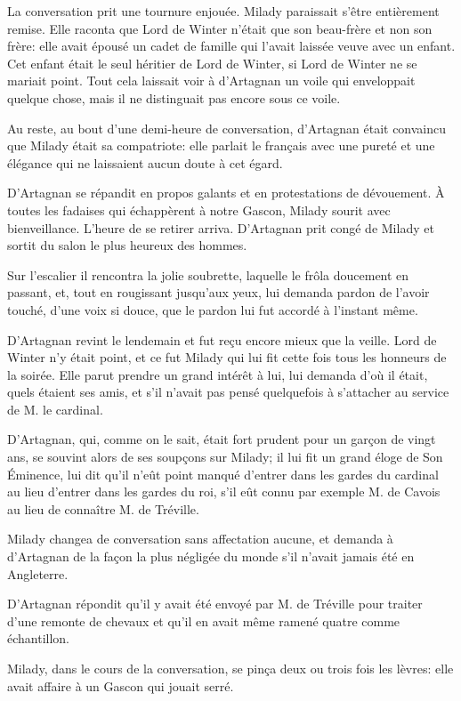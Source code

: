 La conversation prit une tournure enjouée. Milady paraissait s'être entièrement remise. Elle raconta que Lord de Winter n'était que son beau-frère et non son frère: elle avait épousé un cadet de famille qui l'avait laissée veuve avec un enfant. Cet enfant était le seul héritier de Lord de Winter, si Lord de Winter ne se mariait point. Tout cela laissait voir à d'Artagnan un voile qui enveloppait quelque chose, mais il ne distinguait pas encore sous ce voile. 

Au reste, au bout d'une demi-heure de conversation, d'Artagnan était convaincu que Milady était sa compatriote: elle parlait le français avec une pureté et une élégance qui ne laissaient aucun doute à cet égard. 

D'Artagnan se répandit en propos galants et en protestations de dévouement. À toutes les fadaises qui échappèrent à notre Gascon, Milady sourit avec bienveillance. L'heure de se retirer arriva. D'Artagnan prit congé de Milady et sortit du salon le plus heureux des hommes. 

Sur l'escalier il rencontra la jolie soubrette, laquelle le frôla doucement en passant, et, tout en rougissant jusqu'aux yeux, lui demanda pardon de l'avoir touché, d'une voix si douce, que le pardon lui fut accordé à l'instant même. 

D'Artagnan revint le lendemain et fut reçu encore mieux que la veille. Lord de Winter n'y était point, et ce fut Milady qui lui fit cette fois tous les honneurs de la soirée. Elle parut prendre un grand intérêt à lui, lui demanda d'où il était, quels étaient ses amis, et s'il n'avait pas pensé quelquefois à s'attacher au service de M. le cardinal. 

D'Artagnan, qui, comme on le sait, était fort prudent pour un garçon de vingt ans, se souvint alors de ses soupçons sur Milady; il lui fit un grand éloge de Son Éminence, lui dit qu'il n'eût point manqué d'entrer dans les gardes du cardinal au lieu d'entrer dans les gardes du roi, s'il eût connu par exemple M. de Cavois au lieu de connaître M. de Tréville. 

Milady changea de conversation sans affectation aucune, et demanda à d'Artagnan de la façon la plus négligée du monde s'il n'avait jamais été en Angleterre. 

D'Artagnan répondit qu'il y avait été envoyé par M. de Tréville pour traiter d'une remonte de chevaux et qu'il en avait même ramené quatre comme échantillon. 

Milady, dans le cours de la conversation, se pinça deux ou trois fois les lèvres: elle avait affaire à un Gascon qui jouait serré. 

